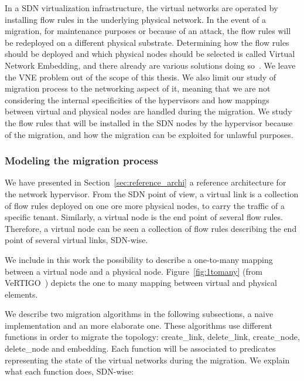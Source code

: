 \label{sec:migration}
In a SDN virtualization infrastructure, the virtual networks are operated by installing flow rules in the underlying physical network.
In the event of a migration, for maintenance purposes or because of an attack, the flow rules will be redeployed on a different physical substrate.
Determining how the flow rules should be deployed and which physical nodes should be selected is called Virtual Network Embedding, and there already are various solutions doing so~\cite{Zangiabady2017e, Papagianni2013, Chowdhury2016d, Wang2015}.
We leave the VNE problem out of the scope of this thesis.
We also limit our study of migration process to the networking aspect of it, meaning that we are not considering the internal specificities of the hypervisors and how mappings between virtual and physical nodes are handled during the migration.
We study the flow rules that will be installed in the SDN nodes by the hypervisor because of the migration, and how the migration can be exploited for unlawful purposes.


\subsubsection{Modeling the migration process}
We have presented in Section~\ref{sec:reference_archi} a reference architecture for the network hypervisor.
From the SDN point of view, a virtual link is a collection of flow rules deployed on one ore more physical nodes, to carry the traffic of a specific tenant.
Similarly, a virtual node is the end point of several flow rules.
Therefore, a virtual node can be seen a collection of flow rules describing the end point of several virtual links, SDN-wise.

We include in this work the possibility to describe a one-to-many mapping between a virtual node and a physical node.
Figure~\ref{fig:1tomany} (from VeRTIGO~\cite{VeRTIGO-Corin2012a}) depicts the one to many mapping between virtual and physical elements.

We describe two migration algorithms in the following subsections, a naive implementation and an more elaborate one.
These algorithms use different functions in order to migrate the topology: create\_link, delete\_link, create\_node, delete\_node and embedding. 
Each function will be associated to predicates representing the state of the virtual networks during the migration.
We explain what each function does, SDN-wise:

